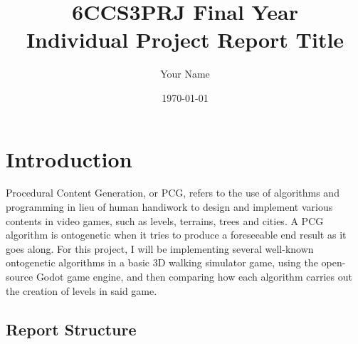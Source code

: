 \documentclass[11pt]{informatics-report}
\title{6CCS3PRJ Final Year\\\vspace{0.2cm}Individual Project Report Title}
\author{Your Name}
\date{\today}
\begin{document}
\createFrontMatter
\onehalfspacing
\tableofcontents
\doublespacing


\chapter{Introduction}

Procedural Content Generation, or PCG, refers to the use of algorithms and programming in lieu of human handiwork to design and implement various contents in video games, such as levels, terrains, trees and cities. A PCG algorithm is ontogenetic when it tries to produce a foreseeable end result as it goes along. For this project, I will be implementing several well-known ontogenetic algorithms in a basic 3D walking simulator game, using the open-source Godot game engine, and then comparing how each algorithm carries out the creation of levels in said game.

\section{Report Structure}












\appendix



\end{document}

